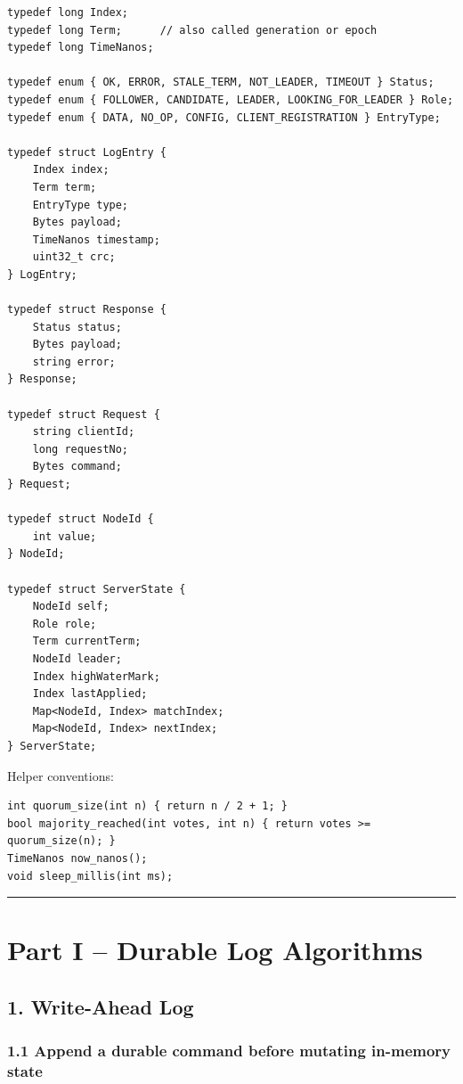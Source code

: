 \documentclass[10pt,letterpaper]{article}
\begin{document}
\begin{verbatim}
typedef long Index;
typedef long Term;      // also called generation or epoch
typedef long TimeNanos;

typedef enum { OK, ERROR, STALE_TERM, NOT_LEADER, TIMEOUT } Status;
typedef enum { FOLLOWER, CANDIDATE, LEADER, LOOKING_FOR_LEADER } Role;
typedef enum { DATA, NO_OP, CONFIG, CLIENT_REGISTRATION } EntryType;

typedef struct LogEntry {
    Index index;
    Term term;
    EntryType type;
    Bytes payload;
    TimeNanos timestamp;
    uint32_t crc;
} LogEntry;

typedef struct Response {
    Status status;
    Bytes payload;
    string error;
} Response;

typedef struct Request {
    string clientId;
    long requestNo;
    Bytes command;
} Request;

typedef struct NodeId {
    int value;
} NodeId;

typedef struct ServerState {
    NodeId self;
    Role role;
    Term currentTerm;
    NodeId leader;
    Index highWaterMark;
    Index lastApplied;
    Map<NodeId, Index> matchIndex;
    Map<NodeId, Index> nextIndex;
} ServerState;
\end{verbatim}

Helper conventions:

\begin{verbatim}
int quorum_size(int n) { return n / 2 + 1; }
bool majority_reached(int votes, int n) { return votes >= quorum_size(n); }
TimeNanos now_nanos();
void sleep_millis(int ms);
\end{verbatim}

\medskip\hrule\medskip

\clearpage
\section*{Part I -- Durable Log Algorithms}

\subsection*{1. Write-Ahead Log}

\subsubsection*{1.1 Append a durable command before mutating in-memory state}
\end{document}
